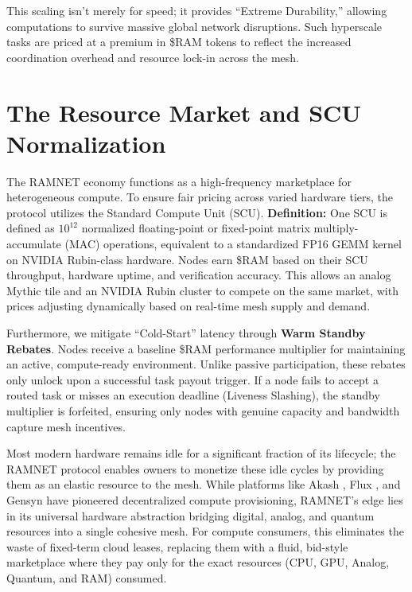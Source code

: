 \documentclass[conference]{IEEEtran}
\begin{document}
This scaling isn't merely for speed; it provides ``Extreme Durability,'' allowing computations to survive massive global network disruptions. Such hyperscale tasks are priced at a premium in \$RAM tokens to reflect the increased coordination overhead and resource lock-in across the mesh.

\section{The Resource Market and SCU Normalization}
The RAMNET economy functions as a high-frequency marketplace for heterogeneous compute. To ensure fair pricing across varied hardware tiers, the protocol utilizes the Standard Compute Unit (SCU). \textbf{Definition:} One SCU is defined as $10^{12}$ normalized floating-point or fixed-point matrix multiply-accumulate (MAC) operations, equivalent to a standardized FP16 GEMM kernel on NVIDIA Rubin-class hardware.
Nodes earn \$RAM based on their SCU throughput, hardware uptime, and verification accuracy. This allows an analog Mythic tile and an NVIDIA Rubin cluster to compete on the same market, with prices adjusting dynamically based on real-time mesh supply and demand.

Furthermore, we mitigate ``Cold-Start'' latency through \textbf{Warm Standby Rebates}. Nodes receive a baseline \$RAM performance multiplier for maintaining an active, compute-ready environment. Unlike passive participation, these rebates only unlock upon a successful task payout trigger. If a node fails to accept a routed task or misses an execution deadline (Liveness Slashing), the standby multiplier is forfeited, ensuring only nodes with genuine capacity and bandwidth capture mesh incentives.

Most modern hardware remains idle for a significant fraction of its lifecycle; the RAMNET protocol enables owners to monetize these idle cycles by providing them as an elastic resource to the mesh. While platforms like Akash \cite{akash2024}, Flux \cite{flux2024}, and Gensyn \cite{gensyn2024} have pioneered decentralized compute provisioning, RAMNET's edge lies in its universal hardware abstraction bridging digital, analog, and quantum resources into a single cohesive mesh. For compute consumers, this eliminates the waste of fixed-term cloud leases, replacing them with a fluid, bid-style marketplace where they pay only for the exact resources (CPU, GPU, Analog, Quantum, and RAM) consumed.
\end{document}
